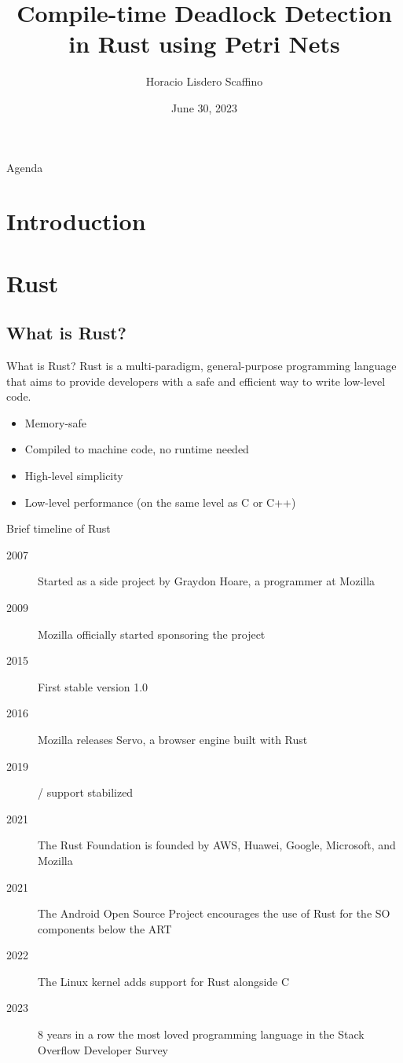 \documentclass{beamer}
\title[Compile-time Deadlock Detection in Rust]{Compile-time Deadlock Detection \\ in Rust using Petri Nets}
\author{Horacio Lisdero Scaffino}
\institute[FIUBA]{Facultad de Ingeniería\\Universidad de Buenos Aires}
\date{June 30, 2023}
\begin{document}
\begin{frame}
  \titlepage
\end{frame}

\logo{}

\begin{frame}{Agenda}
  \tableofcontents
\end{frame}

\section{Introduction}

\section{Rust}

\subsection{What is Rust?}

\begin{frame}{What is Rust?}
  Rust is a multi-paradigm, general-purpose programming language that
  aims to provide developers with a safe and efficient way to write low-level code.

  \pause
  \vfill

  \begin{itemize}
    \item Memory-safe
    \item Compiled to machine code, no runtime needed
    \item High-level simplicity
    \item Low-level performance (on the same level as C or C++)
  \end{itemize}
\end{frame}

\begin{frame}{Brief timeline of Rust}
  \begin{description}
    \item [2007] Started as a side project by Graydon Hoare, a programmer at Mozilla
    \item [2009] Mozilla officially started sponsoring the project
    \item [2015] First stable version 1.0
    \item [2016] Mozilla releases Servo, a browser engine built with Rust
    \item [2019] / support stabilized
    \item [2021] The Rust Foundation is founded by AWS, Huawei, Google, Microsoft, and Mozilla
    \item [2021] The Android Open Source Project encourages the use of Rust for the SO components below the ART
    \item [2022] The Linux kernel adds support for Rust alongside C
    \item [2023] 8 years in a row the most loved programming language in the Stack Overflow Developer Survey
  \end{description}
\end{frame}
\end{document}
